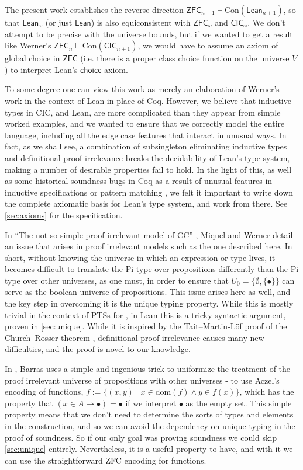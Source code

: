 The present work establishes the reverse direction $\mathsf{ZFC}_{n+1}\vdash\mathrm{Con}(\mathsf{Lean}_{n+1})$, so that $\mathsf{Lean}_\omega$ (or just $\mathsf{Lean}$) is also equiconsistent with $\mathsf{ZFC}_\omega$ and $\mathsf{CIC}_\omega$. We don't attempt to be precise with the universe bounds, but if we wanted to get a result like Werner's $\mathsf{ZFC}_n\vdash\mathrm{Con}(\mathsf{CIC}_{n+1})$, we would have to assume an axiom of global choice in $\mathsf{ZFC}$ (i.e. there is a proper class choice function on the universe $V$) to interpret Lean's $\mathsf{choice}$ axiom.

To some degree one can view this work as merely an elaboration of Werner's work in the context of Lean in place of Coq. However, we believe that inductive types in CIC, and Lean, are more complicated than they appear from simple worked examples, and we wanted to ensure that we correctly model the entire language, including all the edge case features that interact in unusual ways. In fact, as we shall see, a combination of subsingleton eliminating inductive types and definitional proof irrelevance breaks the decidability of Lean's type system, making a number of desirable properties fail to hold. In the light of this, as well as some historical soundness bugs in Coq as a result of unusual features in inductive specifications or pattern matching \cite{soundnessbug}, we felt it important to write down the complete axiomatic basis for Lean's type system, and work from there. See \autoref{sec:axioms} for the specification.

In ``The not so simple proof irrelevant model of CC'' \cite{notsosimple}, Miquel and Werner detail an issue that arises in proof irrelevant models such as the one described here. In short, without knowing the universe in which an expression or type lives, it becomes difficult to translate the Pi type over propositions differently than the Pi type over other universes, as one must, in order to ensure that $U_0=\{\emptyset,\{\bullet\}\}$ can serve as the boolean universe of propositions. This issue arises here as well, and the key step in overcoming it is the unique typing property. While this is mostly trivial in the context of PTSs for \cite{notsosimple}, in Lean this is a tricky syntactic argument, proven in \autoref{sec:unique}. While it is inspired by the Tait--Martin-L\"{o}f proof of the Church--Rosser theorem \cite{taitmartinlof}, definitional proof irrelevance causes many new difficulties, and the proof is novel to our knowledge.

In \cite{barrassets}, Barras uses a simple and ingenious trick to uniformize the treatment of the proof irrelevant universe of propositions with other universes - to use Aczel's encoding of functions, $f:=\{(x,y)\mid x\in\mathrm{dom}(f)\wedge y\in f(x)\}$, which has the property that $(x\in A\mapsto\bullet)=\bullet$ if we interpret $\bullet$ as the empty set. This simple property means that we don't need to determine the sorts of types and elements in the construction, and so we can avoid the dependency on unique typing in the proof of soundness. So if our only goal was proving soundness we could skip \autoref{sec:unique} entirely. Nevertheless, it is a useful property to have, and with it we can use the straightforward ZFC encoding for functions.

